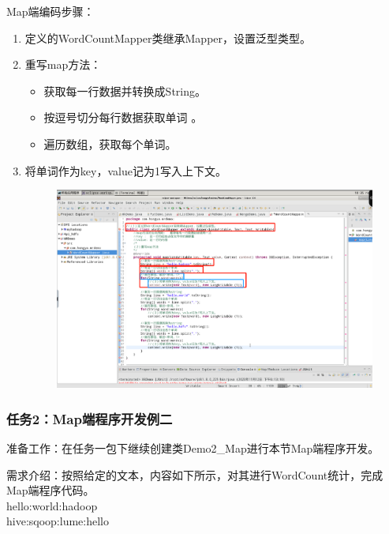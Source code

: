 \documentclass {article}
\begin{document}
				Map端编码步骤：
				\begin{enumerate}
					\item 定义的WordCountMapper类继承Mapper，设置泛型类型。
					\item 重写map方法：
					\begin{itemize}
						\item 获取每一行数据并转换成String。
						\item 按逗号切分每行数据获取单词 。
						\item 遍历数组，获取每个单词。
					\end{itemize}
					\item 将单词作为key，value记为1写入上下文。
					\begin{figure}[H]
						\centering
						\includegraphics[width=4.5in]{figures/fig2.png}
					\end{figure}
				\end{enumerate}		
			
			\subsubsection{任务2：Map端程序开发例二}	
				准备工作：在任务一包下继续创建类Demo2\_Map进行本节Map端程序开发。	
				
				需求介绍：按照给定的文本，内容如下所示，对其进行WordCount统计，完成Map端程序代码。\\
				hello:world:hadoop \\
				hive:sqoop:lume:hello
				
\end{document}
